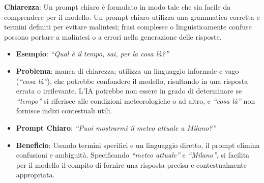             \textbf{Chiarezza}: Un prompt chiaro è formulato in modo tale che sia facile da comprendere per il modello. Un prompt chiaro utilizza una grammatica corretta e termini definiti per evitare malintesi; frasi complesse o linguisticamente confuse possono portare a malintesi o a errori nella generazione delle risposte.
            \begin{itemize}
                \item \textbf{Esempio}: \textit{``Qual è il tempo, sai, per la cosa là?''}
                \item \textbf{Problema}: manca di chiarezza; utilizza un linguaggio informale e vago (\textit{``cosa là''}), che potrebbe confondere il modello, risultando in una risposta errata o irrilevante. L'IA potrebbe non essere in grado di determinare se \textit{``tempo''} si riferisce alle condizioni meteorologiche o ad altro, e \textit{``cosa là''} non fornisce indizi contestuali utili.
                \item \textbf{Prompt Chiaro}: \textit{``Puoi mostrarmi il meteo attuale a Milano?''}
                \item \textbf{Beneficio}: Usando termini specifici e un linguaggio diretto, il prompt elimina confusioni e ambiguità. Specificando \textit{``meteo attuale''} e \textit{``Milano''}, si facilita per il modello il compito di fornire una risposta precisa e contestualmente appropriata.
            \end{itemize}

